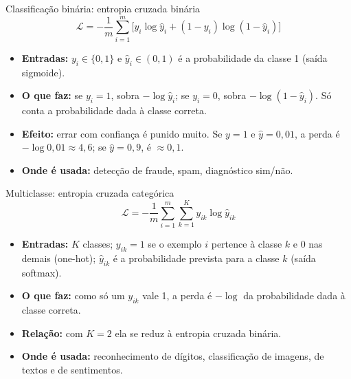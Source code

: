 \documentclass[10pt]{beamer}
\begin{document}
\begin{frame}{Classificação binária: entropia cruzada binária}
\[ \mathcal{L}=-\frac{1}{m}\sum_{i=1}^m\big[y_i\log\hat{y}_i+(1-y_i)\log(1-\hat{y}_i)\big] \]
\begin{itemize}
 \item \textbf{Entradas:} $y_i\in\{0,1\}$ e $\hat y_i\in(0,1)$ é a probabilidade da classe 1 (saída sigmoide).
 \item \textbf{O que faz:} se $y_i=1$, sobra $-\log\hat y_i$; se $y_i=0$, sobra $-\log(1-\hat y_i)$. Só conta a probabilidade dada à classe correta.
 \item \textbf{Efeito:} errar com confiança é punido muito. Se $y=1$ e $\hat y=0{,}01$, a perda é $-\log0{,}01\approx4{,}6$; se $\hat y=0{,}9$, é $\approx0{,}1$.
 \item \textbf{Onde é usada:} detecção de fraude, spam, diagnóstico sim/não.
\end{itemize}
\end{frame}

\begin{frame}{Multiclasse: entropia cruzada categórica}
\[ \mathcal{L}=-\frac{1}{m}\sum_{i=1}^m\sum_{k=1}^{K}y_{ik}\log\hat{y}_{ik} \]
\begin{itemize}
 \item \textbf{Entradas:} $K$ classes; $y_{ik}=1$ se o exemplo $i$ pertence à classe $k$ e $0$ nas demais (one-hot); $\hat y_{ik}$ é a probabilidade prevista para a classe $k$ (saída softmax).
 \item \textbf{O que faz:} como só um $y_{ik}$ vale 1, a perda é $-\log$ da probabilidade dada à classe correta.
 \item \textbf{Relação:} com $K=2$ ela se reduz à entropia cruzada binária.
 \item \textbf{Onde é usada:} reconhecimento de dígitos, classificação de imagens, de textos e de sentimentos.
\end{itemize}
\end{frame}
\end{document}
